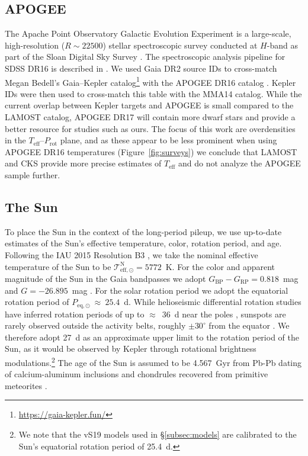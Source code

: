 \documentclass[trackchanges,twocolumn]{aastex631}
\newcommand{\jvs}{vS19\xspace}
\newcommand{\mma}{MMA14\xspace}
\newcommand{\teff}{\ensuremath{T_{\mathrm{eff}}}\xspace}
\newcommand{\prot}{\ensuremath{P_\mathrm{rot}}\xspace}
\begin{document}
\newpage
\subsection{APOGEE}
The Apache Point Observatory Galactic Evolution Experiment \citep[APOGEE;][]{Majewski2017} is a large-scale, high-resolution ($R \sim 22500$) stellar spectroscopic survey conducted at $H$-band as part of the Sloan Digital Sky Survey \citep[SDSS-IV;][]{Blanton2017}. The spectroscopic analysis pipeline for SDSS DR16 is described in \citet{Jonsson2020}. We used Gaia DR2 source IDs \citep{Gaia2016, Gaia2018} to cross-match Megan Bedell's Gaia--Kepler catalog\footnote{\url{https://gaia-kepler.fun/}} with the APOGEE DR16 catalog \citep{Ahumada2020}. Kepler IDs were then used to cross-match this table with the \mma catalog. While the current overlap between Kepler targets and APOGEE is small compared to the LAMOST catalog, APOGEE DR17 will contain more dwarf stars and provide a better resource for studies such as ours. The focus of this work are overdensities in the \teff--\prot plane, and as these appear to be less prominent when using  APOGEE DR16 temperatures (Figure~\ref{fig:surveys}) we conclude that LAMOST and CKS provide more precise estimates of \teff and do not analyze the APOGEE sample further. 

\subsection{The Sun}
To place the Sun in the context of the long-period pileup, we use up-to-date estimates of the Sun's effective temperature, color, rotation period, and age. Following the IAU 2015 Resolution B3 \citep{Prsa2016}, we take the nominal effective temperature of the Sun to be $\mathcal{T}^\mathrm{N}_\mathrm{eff,\odot} = 5772$~K. For the color and apparent magnitude of the Sun in the Gaia bandpasses we adopt $G_\mathrm{BP}-G_\mathrm{RP} = 0.818$~mag and $G = -26.895$~mag \citep{Casagrande2018}. For the solar rotation period we adopt the equatorial rotation period of $P_\mathrm{eq,\odot}~\approx~25.4$~d. While helioseismic differential rotation studies have inferred rotation periods of up to $\approx$~36~d near the poles \citep[][and references therein]{Thompson2003}, sunspots are rarely observed outside the activity belts, roughly $\pm 30^\circ$ from the equator \citep[][and references therein]{Hathaway2015}. We therefore adopt 27~d as an approximate upper limit to the rotation period of the Sun, as it would be observed by Kepler through rotational brightness modulations.\footnote{We note that the \jvs models used in \S\ref{subsec:models} are calibrated to the Sun's equatorial rotation period of 25.4~d.} The age of the Sun is assumed to be 4.567~Gyr from Pb-Pb dating of calcium-aluminum inclusions and chondrules recovered from primitive meteorites \citep[][and references therein]{Bahcall1995}.
\end{document}

